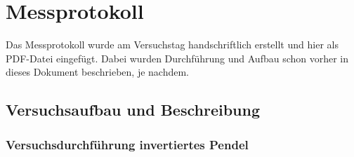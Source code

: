 

\def\skalierung{0.65}

\chapter{Messprotokoll}
\label{chap:protokoll}

Das Messprotokoll wurde am Versuchstag handschriftlich erstellt und hier als
PDF-Datei eingefügt. Dabei wurden Durchführung und Aufbau schon vorher in dieses
Dokument beschrieben, je nachdem.

\section{Versuchsaufbau und Beschreibung}
\label{sec:aufbau}



\subsection{Versuchsdurchführung invertiertes Pendel}

